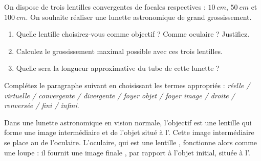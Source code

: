 \documentclass[11pt]{article}
\begin{document}
\begin{exercice}
On dispose de trois lentilles convergentes de focales respectives : $\SI{10}{cm}$, $\SI{50}{cm}$ et $\SI{100}{cm}$. On souhaite réaliser une lunette astronomique de grand grossissement.
\begin{enumerate}
    \item Quelle lentille choisirez-vous comme objectif ? Comme oculaire ? Justifiez.
    \item Calculez le grossissement maximal possible avec ces trois lentilles.
    \item Quelle sera la longueur approximative du tube de cette lunette ?
\end{enumerate}
\end{exercice}

\begin{exercice}
Complétez le paragraphe suivant en choisissant les termes appropriés : \textit{réelle / virtuelle / convergente / divergente / foyer objet / foyer image / droite / renversée / fini / infini}.

Dans une lunette astronomique en vision normale, l'objectif est une lentille \underline{\hspace{3cm}} qui forme une image intermédiaire \underline{\hspace{3cm}} et \underline{\hspace{3cm}} de l'objet situé à l'\underline{\hspace{3cm}}. Cette image intermédiaire se place au \underline{\hspace{3cm}} de l'oculaire. L'oculaire, qui est une lentille \underline{\hspace{3cm}}, fonctionne alors comme une loupe : il fournit une image finale \underline{\hspace{3cm}}, \underline{\hspace{3cm}} par rapport à l'objet initial, située à l'\underline{\hspace{3cm}}.
\end{exercice}
\end{document}
